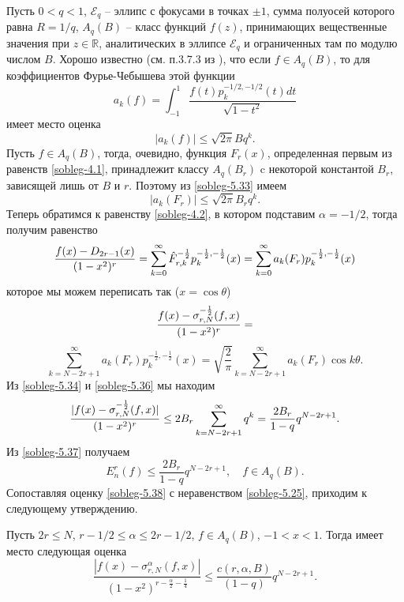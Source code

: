 Пусть $0<q<1$, $\mathcal{ E}_q$ -- эллипс с фокусами в точках $\pm1$, сумма полуосей которого равна $R=1/q$, $A_q(B)$ -- класс функций $f(z)$, принимающих вещественные значения при $z\in\mathbb{R}$,  аналитических в эллипсе $\mathcal{ E}_q$ и ограниченных там по модулю числом $B$. Хорошо известно  (см. п.3.7.3 из \cite{Timan}), что если $f\in A_q(B)$, то для коэффициентов Фурье-Чебышева этой функции
\begin{equation}\label{sobleg-5.32}
 a_k(f)=\int_{-1}^1\frac{f(t)p_k^{-1/2,-1/2}(t)dt}{\sqrt{1-t^2}}
 \end{equation}
имеет место оценка
\begin{equation}\label{sobleg-5.33}
 |a_k(f)|\le\sqrt{2\pi}Bq^k.
 \end{equation}
Пусть $f\in A_q(B)$, тогда, очевидно, функция $F_r(x)$, определенная первым из равенств \eqref{sobleg-4.1},  принадлежит классу $A_q(B_r)$ c некоторой константой $B_r$, зависящей лишь от $B$  и $r$. Поэтому из \eqref{sobleg-5.33}
имеем
\begin{equation}\label{sobleg-5.34}
 |a_k(F_r)|\le\sqrt{2\pi}B_rq^k.
 \end{equation}
Теперь обратимся к равенству \eqref{sobleg-4.2}, в котором подставим  $\alpha=-1/2$, тогда получим равенство
 \begin{equation}\label{sobleg-5.35}
{f(x)-D_{2r-1}(x)\over(1-x^2)^r}=
 \sum_{k=0}^\infty \hat F_{r,k}^{-\frac12} p_{k}^{-\frac12,-\frac12}(x)=
 \sum_{k=0}^\infty a_k(F_r) p_{k}^{-\frac12,-\frac12}(x)
\end{equation}
которое мы можем переписать так ($x=\cos\theta$)
$$
{f(x)-\sigma_{r,N}^{-\frac12}(f,x)\over(1-x^2)^r}=
$$
\begin{equation}\label{sobleg-5.36}
  \sum_{k=N-2r+1}^\infty a_k(F_r) p_{k}^{-\frac12,-\frac12}(x)=\sqrt{\frac2\pi}
  \sum_{k=N-2r+1}^\infty a_k(F_r) \cos k\theta.
\end{equation}
Из \eqref{sobleg-5.34} и \eqref{sobleg-5.36} мы находим
\begin{equation}\label{sobleg-5.37}
 {|f(x)-\sigma_{r,N}^{-\frac12}(f,x)|\over(1-x^2)^r}\le 2B_r\sum_{k=N-2r+1}^\infty q^k=
 \frac{2B_r}{1-q}q^{N-2r+1}.
  \end{equation}
Из \eqref{sobleg-5.37} получаем
\begin{equation}\label{sobleg-5.38}
 E_{n}^r(f)\le \frac{2B_r}{1-q}q^{N-2r+1},\quad f\in A_q(B).
  \end{equation}
Сопоставляя оценку \eqref{sobleg-5.38} с неравенством \eqref{sobleg-5.25}, приходим к следующему утверждению.
\begin{corollary}\label{soblegcor4}
Пусть $2r\le N$, $r-1/2\le \alpha\le 2r-1/2$, $f\in A_q(B)$, $-1<x<1$. Тогда имеет место следующая оценка
\begin{equation}\label{sobleg-5.39}
 \frac{|f(x)-\sigma_{r,N}^\alpha(f,x)|}
{(1-x^2)^{r-\frac{\alpha}{2}-\frac14}}\le\frac{c(r,\alpha, B)}{(1-q)}q^{N-2r+1}.
 \end{equation}
\end{corollary}




